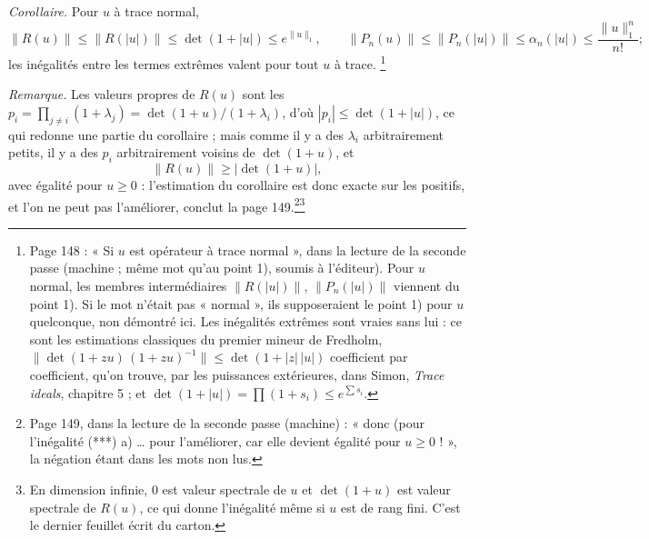 \documentclass[11pt,a4paper]{article}
\begin{document}
\emph{Corollaire.} Pour $u$ à trace normal,
\[
  \|R(u)\| \leq \|R(|u|)\| \leq \det(1 + |u|) \leq e^{\|u\|_1}, \qquad
  \|P_n(u)\| \leq \|P_n(|u|)\| \leq \alpha_n(|u|) \leq \frac{\|u\|_1^n}{n!} ;
\]
les inégalités entre les termes extrêmes valent pour tout $u$ à trace.
\footnote{Page 148 : « Si $u$ est opérateur à trace normal », dans la lecture
de la seconde passe (machine ; même mot qu'au point 1), soumis à
l'éditeur). Pour $u$ normal, les membres intermédiaires $\|R(|u|)\|$,
$\|P_n(|u|)\|$ viennent du point 1). Si le mot n'était pas « normal », ils
supposeraient le point 1) pour $u$ quelconque, non démontré ici. Les
inégalités extrêmes sont vraies sans lui : ce sont les estimations
classiques du premier mineur de Fredholm, $\|\det(1+zu)\,(1+zu)^{-1}\| \leq
\det(1 + |z|\,|u|)$ coefficient par coefficient, qu'on trouve, par les
puissances extérieures, dans Simon, \emph{Trace ideals}, chapitre 5 ; et
$\det(1+|u|) = \prod(1 + s_i) \leq e^{\sum s_i}$.}

\emph{Remarque.} Les valeurs propres de $R(u)$ sont les $p_i = \prod_{j
\neq i}(1 + \lambda_j) = \det(1+u)/(1 + \lambda_i)$, d'où $|p_i| \leq
\det(1 + |u|)$, ce qui redonne une partie du corollaire ; mais comme il y a
des $\lambda_i$ arbitrairement petits, il y a des $p_i$ arbitrairement
voisins de $\det(1+u)$, et
\[
  \|R(u)\| \geq |\det(1+u)| ,
\]
avec égalité pour $u \geq 0$ : l'estimation du corollaire est donc exacte
sur les positifs, et l'on ne peut pas l'améliorer, conclut la page
149.\footnote{Page 149, dans la lecture de la seconde passe (machine) :
« donc (pour l'inégalité (***) a) … pour l'améliorer, car elle devient
égalité pour $u \geq 0$ ! », la négation étant dans les mots non lus.}\footnote{En dimension infinie, $0$ est valeur spectrale de
$u$ et $\det(1+u)$ est valeur spectrale de $R(u)$, ce qui donne
l'inégalité même si $u$ est de rang fini. C'est le dernier feuillet écrit du
carton.}
\end{document}
